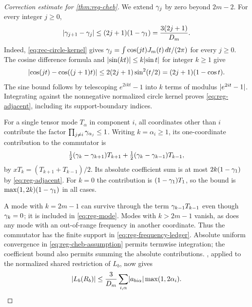 \begin{proof}[Correction estimate for \cref{thm:reg-cheb}]
We extend $\gamma_j$ by zero beyond $2m-2$. For every integer $j\ge0$,
\begin{equation}\label{eq:reg-adjacent}
 \lvert \gamma_{j+1}-\gamma_j\rvert
 \le(2j+1)(1-\gamma_1)=\frac{3(2j+1)}{D_m}.
\end{equation}
Indeed, \eqref{eq:rec-circle-kernel} gives
$\gamma_j=\int\cos(jt)J_m(t)\,dt/(2\pi)$ for every $j\ge0$.
The cosine difference formula and
$\lvert \sin(kt)\rvert\le k\lvert \sin t\rvert$ for integer $k\ge1$ give
\[
 \lvert \cos(jt)-\cos((j+1)t)\rvert
 \le2(2j+1)\sin^2(t/2)=(2j+1)(1-\cos t).
\]
The sine bound follows by telescoping $e^{2ikt}-1$ into $k$ terms of
modulus $\lvert e^{2it}-1\rvert$. Integrating against the nonnegative normalized
circle kernel proves \eqref{eq:reg-adjacent}, including its
support-boundary indices.

For a single tensor mode $T_\alpha$ in component $i$, all coordinates
other than $i$ contribute the factor
$\prod_{j\ne i}\gamma_{\alpha_j}\le1$. Writing $k=\alpha_i\ge1$,
its one-coordinate contribution to the commutator is
\begin{equation}\label{eq:reg-mode}
 \tfrac12(\gamma_k-\gamma_{k+1})T_{k+1}
 +\tfrac12(\gamma_k-\gamma_{k-1})T_{k-1},
\end{equation}
by $xT_k=(T_{k+1}+T_{k-1})/2$. Its absolute coefficient sum is at most
$2k(1-\gamma_1)$ by \eqref{eq:reg-adjacent}. For $k=0$ the contribution
is $(1-\gamma_1)T_1$, so the bound is
$\max(1,2k)(1-\gamma_1)$ in all cases.

A mode with $k=2m-1$ can survive through the term
$\gamma_{k-1}T_{k-1}$ even though $\gamma_k=0$; it is included in
\eqref{eq:reg-mode}. Modes with $k>2m-1$ vanish, as does any mode with
an out-of-range frequency in another coordinate. Thus the commutator has
the finite support in \eqref{eq:reg-frequency-ledger}. Absolute uniform
convergence in \eqref{eq:reg-cheb-assumption} permits termwise integration;
the coefficient bound also permits summing the absolute contributions.
, applied to the normalized shared restriction of
$L_b$, now gives
\begin{equation}\label{eq:reg-cheb-correction}
 \lvert L_b(R_b)\rvert\le\frac3{D_m}
    \sum_{i,\alpha}\lvert a_{bi\alpha}\rvert\max(1,2\alpha_i).
\end{equation}
\end{proof}

